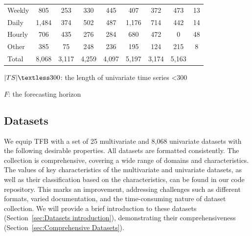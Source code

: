 \documentclass[sigconf, nonacm, pdfa]{acmart}
\begin{document}
\begin{table}[t]
\begin{threeparttable}
\begin{tabular}{l|cccccccc}
Weekly     & 805 & 253 & 330 & 445 & 407 & 372  & 473& 13\\
Daily      & 1,484 & 374 & 502 & 487 & 1,176 & 714  & 442 & 14\\
Hourly     & 706 & 435 & 276 & 284 & 680 & 472  & 0& 48\\
Other      & 385 & 75 & 248 & 236 & 195 & 124 & 215& 8\\\hline
Total      & 8,068 & 3,117 & 4,259 & 4,097 & 5,197 & 3,174 & 5,163\\\hline
\end{tabular}
    \begin{tablenotes}
    \tiny
      \item[1] $|TS|\textless300$: the length of univariate time series \textless300
      \item[2] $F$: the forecasting horizon
    \end{tablenotes}
\end{threeparttable}
\end{table}



\subsection{Datasets}
\label{sec:Datasets} 
We equip TFB with a set of 25 multivariate and 8,068 univariate datasets with the following desirable properties. 
All datasets are formatted consistently. 
The collection is comprehensive, covering a wide range of domains and characteristics.
The values of key characteristics of the multivariate and univariate datasets, as well as their classification based on the characteristics, can be found in our code repository.
This marks an improvement, addressing challenges such as different formats, varied documentation, and the time-consuming nature of dataset collection. 
We will provide a brief introduction to these datasets (Section~\ref{sec:Datasets introduction}), demonstrating their comprehensiveness (Section~\ref{sec:Comprehensive Datasets}).

\end{document}
